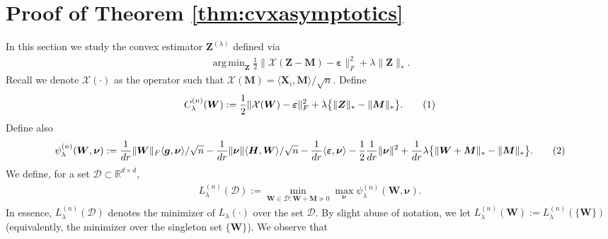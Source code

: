 \documentclass[10pt]{article}
\newcommand\numberthis{\addtocounter{equation}{1}\tag{\theequation}}
\DeclareMathOperator*{\argmin}{arg\,min}
\newcommand{\eps}{\ensuremath{\varepsilon}}
\theoremstyle{definition}
\begin{document}
\section{Proof of Theorem \ref{thm:cvxasymptotics}} \label{sec:step1}
In this section we study the convex estimator $\bm{Z}^{(\lambda)}$ defined via
\begin{align}
    \argmin_{\bm{Z}} \frac{1}{2} \| \mathcal{X}(\bm{Z - M}) - \bm{\eps} \|_F^2 + \lambda \| \bm{Z} \|_*.
\end{align}
Recall we denote $\mathcal{X}(\cdot)$ as the operator such that $\mathcal{X}(\bm{M}) = \langle \bm{X}_i, \bm{M} \rangle/ \sqrt{n}$.  %
Define 
\begin{align}
C^{(n)}_{\lambda}(\bm{W}) := \frac{1}{2}     \| \mathcal{X}(\bm{W}) - \bm{\eps} \|_F^2 + \lambda\big\{ \| \bm{Z}  \|_* - \| \bm{M} \|_* \big\}. \numberthis \label{Cndef}
\end{align}
Define also
\begin{align}
 \psi^{(n)}_{\lambda}( \bm{W} , \bm{\nu}) :=  \frac{1}{dr} \| \bm{W} \|_F \langle \bm{g}, \bm{\nu} \rangle/\sqrt{n} - \frac{1}{dr}\| \bm{\nu}\| \langle \bm{H}, \bm{W}
    \rangle /\sqrt{n}- \frac{1}{dr}\langle \bm{\eps}, \bm{\nu} \rangle - \frac{1}{2} \frac{1}{dr}\| \bm{\nu} \|^2 +\frac{1}{dr} \lambda \big\{ \| \bm{W} + \bm{M}\|_* - \|\bm{M}\|_* \big\}. \numberthis \label{psindef}
\end{align}
We define, for a set $\mathcal{D} \subset \mathbb{R}^{d\times d}$, 
\begin{align}
    L^{(n)}_{\lambda}(\mathcal{D}) := \min_{\bm{W} \in \mathcal{D}: \bm{W} + \bm{M} \succcurlyeq 0 } \max_{\bm{\nu}} \psi^{(n)}_{\lambda}( \bm{W} , \bm{\nu}).
\end{align}
In essence, $L_{\lambda}^{(n)}(\mathcal{D})$ denotes the minimizer of $L_{\lambda}(\cdot)$ over the set $\mathcal{D}$.  By slight abuse of notation, we let $L_{\lambda}^{(n)}(\bm{W}) := L_{\lambda}^{(n)}(\{\bm{W}\})$ (equivalently, the minimizer over the singleton set $\{\bm{W}\}$).  
We observe that 
\end{document}

